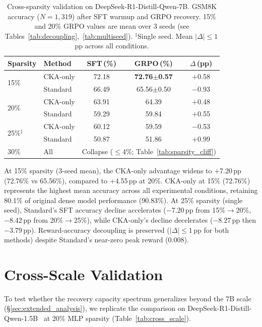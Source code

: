 \begin{table}[h]
\centering
\small
\caption{Cross-sparsity validation on DeepSeek-R1-Distill-Qwen-7B. GSM8K accuracy ($N{=}1{,}319$) after SFT warmup and GRPO recovery. 15\% and 20\% GRPO values are mean over 3 seeds (see Tables~\ref{tab:decoupling},~\ref{tab:multiseed}). $^\ddagger$Single seed. Mean $|\Delta| \leq 1$\,pp across all conditions.}
\label{tab:cross_sparsity}
\begin{tabular}{@{}llccc@{}}
\toprule
Sparsity & Method & SFT\,(\%) & GRPO\,(\%) & $\Delta$\,(pp) \\
\midrule
\multirow{2}{*}{15\%} & CKA-only & 72.18 & \textbf{72.76{\scriptsize$\pm$0.57}} & $+$0.58 \\
 & Standard & 66.49 & 65.56{\scriptsize$\pm$0.50} & $-$0.93 \\
\midrule
\multirow{2}{*}{20\%} & CKA-only & 63.91 & 64.39 & $+$0.48 \\
 & Standard & 59.29 & 59.84 & $+$0.55 \\
\midrule
\multirow{2}{*}{25\%$^\ddagger$} & CKA-only & 60.12 & 59.59 & $-$0.53 \\
 & Standard & 50.87 & 51.86 & $+$0.99 \\
\midrule
30\% & All & \multicolumn{3}{c}{Collapse ($\leq$4\%; Table~\ref{tab:sparsity_cliff})} \\
\bottomrule
\end{tabular}
\end{table}

At 15\% sparsity (3-seed mean), the CKA-only advantage widens to $+$7.20\,pp (72.76\% vs 65.56\%), compared to $+$4.55\,pp at 20\%.
CKA-only at 15\% (72.76\%) represents the highest mean accuracy across all experimental conditions, retaining 80.1\% of original dense model performance (90.83\%).
At 25\% sparsity (single seed), Standard's SFT accuracy decline accelerates ($-$7.20\,pp from 15\%$\to$20\%, $-$8.42\,pp from 20\%$\to$25\%), while CKA-only's decline decelerates ($-$8.27\,pp then $-$3.79\,pp).
Reward-accuracy decoupling is preserved ($|\Delta| \leq 1$\,pp for both methods) despite Standard's near-zero peak reward (0.008).

\section{Cross-Scale Validation}
\label{sec:appendix_cross_scale}

To test whether the recovery capacity spectrum generalizes beyond the 7B scale (\S\ref{sec:extended_analysis}), we replicate the comparison on DeepSeek-R1-Distill-Qwen-1.5B~\citep{deepseek2025r1} at 20\% MLP sparsity (Table~\ref{tab:cross_scale}).

